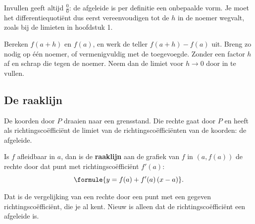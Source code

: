 Invullen geeft altijd $\frac00$: de afgeleide is per definitie een onbepaalde vorm. Je moet het differentiequotiënt dus eerst vereenvoudigen tot de $h$ in de noemer wegvalt, zoals bij de limieten in hoofdstuk 1.


\begin{werkwijze}
Bereken $f(a + h)$ en $f(a)$, en werk de teller $f(a + h) - f(a)$ uit. Breng zo nodig op één noemer, of vermenigvuldig met de toegevoegde. Zonder een factor $h$ af en schrap die tegen de noemer. Neem dan de limiet voor $h \to 0$ door in te vullen.
\end{werkwijze}

\begin{oefeningen}
\end{oefeningen}

\subsection{De raaklijn}

De koorden door $P$ draaien naar een grensstand. Die rechte gaat door $P$ en heeft als richtingscoëfficiënt de limiet van de richtingscoëfficiënten van de koorden: de afgeleide.

\begin{theorie}
Is $f$ afleidbaar in $a$, dan is de \textbf{\textcolor{accent}{raaklijn}} aan de grafiek van $f$ in $(a, f(a))$ de rechte door dat punt met richtingscoëfficiënt $f'(a)$:
\[\formule{y = f(a) + f'(a)\,(x - a)}.\]
\end{theorie}

Dat is de vergelijking van een rechte door een punt met een gegeven richtingscoëfficiënt, die je al kent. Nieuw is alleen dat de richtingscoëfficiënt een afgeleide is.

